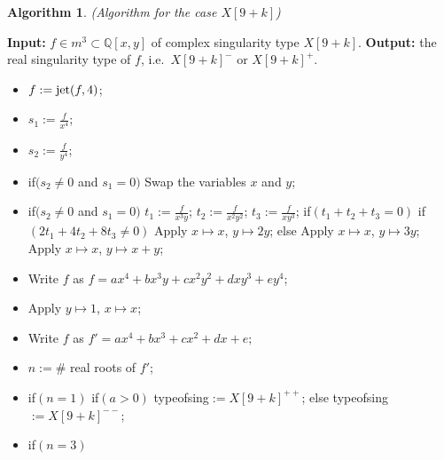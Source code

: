 \documentclass{amsproc}
\begin{document}
\newtheorem{X[9+k]}[kjet]{Algorithm}
\begin{X[9+k]}(Algorithm for the case $X[9+k]$)
\end{X[9+k]}
\noindent\textnormal{\bf Input:} $f\in m^3\subset\mathbb Q[x,y]$ of complex singularity type $X[9+k]$.\newline
\textnormal{\bf Output:} the real singularity type of $f$, i.e.~$X[9+k]^-$ or $X[9+k]^+$.
\begin{itemize}
\item $f:=\textnormal{jet}(f,4)$;
\item $s_1:=\frac{f}{x^4}$;
\item $s_2:=\frac{f}{y^4}$;
\item if$(s_2\neq0$ and $s_1=0)$\newline
\phantom{}\quad Swap the variables $x$ and $y$;\newline
\item if$(s_2\neq0$ and $s_1=0)$\newline
\phantom{}\quad $t_1:=\frac{f}{x^3y}$;\newline
\phantom{}\quad $t_2:=\frac{f}{x^2y^2}$;\newline
\phantom{}\quad $t_3:=\frac{f}{xy^3}$;\newline
\phantom{}\quad if$(t_1+t_2+t_3=0)$\newline
\phantom{}\quad\quad if$(2t_1+4t_2+8t_3\neq0)$\newline
\phantom{}\quad\quad\quad Apply $x\mapsto x$, $y\mapsto 2y$;\newline
\phantom{}\quad\quad else\newline
\phantom{}\quad\quad\quad Apply $x\mapsto x$, $y\mapsto 3y$;\newline
\phantom{}\quad Apply $x\mapsto x$, $y\mapsto x+y$;
\item Write $f$ as $f=ax^4+bx^3y+cx^2y^2+dxy^3+ey^4$;
\item Apply $y\mapsto 1$, $x\mapsto x$;
\item Write $f$ as $f'=ax^4+bx^3+cx^2+dx+e;$
\item $n:=\#$ real roots of $f'$; 
\item if$(n=1)$\newline
\phantom{}\quad if$(a>0)$\newline
\phantom{}\quad\quad typeofsing$:=X[9+k]^{++}$;\newline
\phantom{}\quad else\newline
\phantom{}\quad\quad typeofsing$:=X[9+k]^{--}$;
\item if$(n=3)$\newline

\end{itemize}
\end{document}
